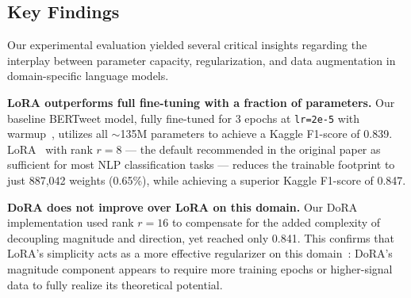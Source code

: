 \documentclass[conference]{IEEEtran}
\begin{document}
\begin{table}[h]
\centering
\caption{Results on the Kaggle public leaderboard.
         The best score is highlighted in \textbf{bold}.}
\label{tab:results}
\end{table}

\subsection{Key Findings}

Our experimental evaluation yielded several critical insights regarding the interplay between parameter capacity, regularization, and data augmentation in domain-specific language models.

\textbf{LoRA outperforms full fine-tuning with a fraction of parameters.}
Our baseline BERTweet model, fully fine-tuned for 3 epochs at \texttt{lr=2e-5} with warmup~\cite{devlin2019bert}, utilizes all $\sim$135M parameters to achieve a Kaggle F1-score of 0.839. LoRA~\cite{hu2021lora} with rank $r=8$ — the default recommended in the original paper as sufficient for most NLP classification tasks — reduces the trainable footprint to just 887,042 weights (0.65\%), while achieving a superior Kaggle F1-score of 0.847.

\textbf{DoRA does not improve over LoRA on this domain.}
Our DoRA~\cite{liu2024dora} implementation used rank $r=16$ to compensate for the added complexity of decoupling magnitude and direction, yet reached only 0.841. This confirms that LoRA's simplicity acts as a more effective regularizer on this domain~\cite{ullah2025lora}: DoRA's magnitude component appears to require more training epochs or higher-signal data to fully realize its theoretical potential.
\end{document}
